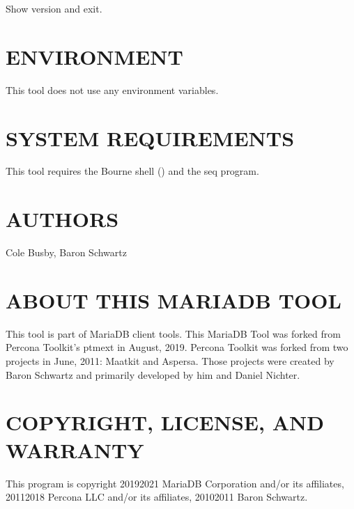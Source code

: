 \documentclass[letterpaper,10pt,english]{sphinxmanual}
\begin{document}
\begin{fulllineitems}
\label{\detokenize{mariadb-status-diff:cmdoption-mariadb-status-diff-version}}
\sphinxAtStartPar
Show version and exit.

\end{fulllineitems}



\section{ENVIRONMENT}
\label{\detokenize{mariadb-status-diff:environment}}
\sphinxAtStartPar
This tool does not use any environment variables.


\section{SYSTEM REQUIREMENTS}
\label{\detokenize{mariadb-status-diff:system-requirements}}
\sphinxAtStartPar
This tool requires the Bourne shell () and the seq program.


\section{AUTHORS}
\label{\detokenize{mariadb-status-diff:authors}}
\sphinxAtStartPar
Cole Busby, Baron Schwartz


\section{ABOUT THIS MARIADB TOOL}
\label{\detokenize{mariadb-status-diff:about-this-mariadb-tool}}
\sphinxAtStartPar
This tool is part of MariaDB client tools. This MariaDB Tool was forked from
Percona Toolkit’s pt\sphinxhyphen{}mext in August, 2019. Percona Toolkit was forked from two
projects in June, 2011: Maatkit and Aspersa.  Those projects were created by
Baron Schwartz and primarily developed by him and Daniel Nichter.


\section{COPYRIGHT, LICENSE, AND WARRANTY}
\label{\detokenize{mariadb-status-diff:copyright-license-and-warranty}}
\sphinxAtStartPar
This program is copyright 2019\sphinxhyphen{}2021 MariaDB Corporation and/or its affiliates,
2011\sphinxhyphen{}2018 Percona LLC and/or its affiliates, 2010\sphinxhyphen{}2011 Baron Schwartz.
\end{document}
